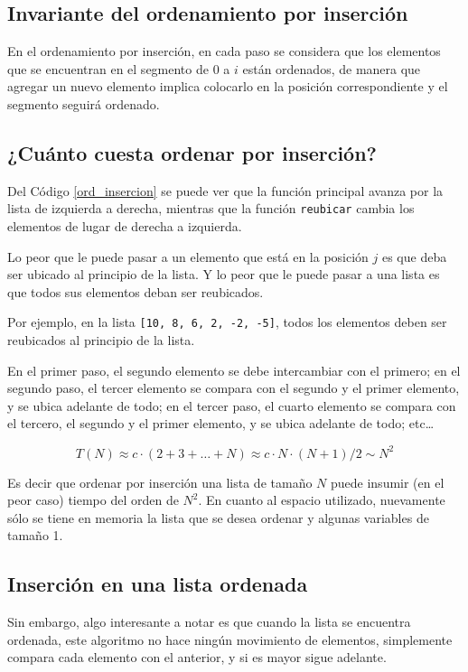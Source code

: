 \subsection{Invariante del ordenamiento por inserción}

En el ordenamiento por inserción, en cada paso se considera que los
elementos que se encuentran en el segmento de $0$ a $i$ están ordenados, de
manera que agregar un nuevo elemento implica colocarlo en la posición
correspondiente y el segmento seguirá ordenado.

\subsection{¿Cuánto cuesta ordenar por inserción?}

Del Código \ref{ord_insercion} se puede ver que la función principal avanza por la
lista de izquierda a derecha, mientras que la función \lstinline!reubicar!
cambia los elementos de lugar de derecha a izquierda.

Lo peor que le puede pasar a un elemento que está en la posición
$j$ es que deba ser ubicado al principio de la lista.  Y lo peor que le
puede pasar a una lista es que todos sus elementos deban ser reubicados.

Por ejemplo, en la lista \lstinline+[10, 8, 6, 2, -2, -5]+, todos los
elementos deben ser reubicados al principio de la lista.

En el primer paso, el segundo elemento se debe intercambiar con el primero;
en el segundo paso, el tercer elemento se compara con el segundo y el
primer elemento, y se ubica adelante de todo; en el tercer paso, el cuarto
elemento se compara con el tercero, el segundo y el primer elemento, y se
ubica adelante de todo; etc\ldots

$$ T(N) \approx c \cdot (2 + 3 + \ldots + N) \approx c \cdot N \cdot (N+1)/2 \sim N^2 $$

Es decir que ordenar por inserción una lista de tamaño $N$ puede insumir
(en el peor caso) tiempo del orden de $N^2$. En cuanto al espacio
utilizado, nuevamente sólo se tiene en memoria la lista que se desea
ordenar y algunas variables de tamaño 1.

\subsection{Inserción en una lista ordenada}

Sin embargo, algo interesante a notar es que cuando la lista se encuentra
ordenada, este algoritmo no hace ningún movimiento de elementos,
simplemente compara cada elemento con el anterior, y si es mayor sigue
adelante.

